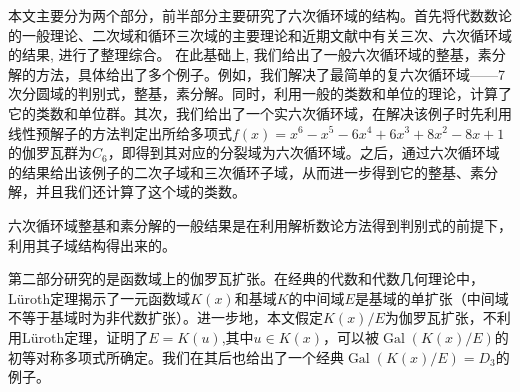 \begin{cnabstract}
本文主要分为两个部分，前半部分主要研究了六次循环域的结构。首先将代数数论的一般理论、二次域和循环三次域的主要理论和近期文献中有关三次、六次循环域的结果, 进行了整理综合。 在此基础上, 我们给出了一般六次循环域的整基，素分解的方法，具体给出了多个例子。例如，我们解决了最简单的复六次循环域——7次分圆域的判别式，整基，素分解。同时，利用一般的类数和单位的理论，计算了它的类数和单位群。其次，我们给出了一个实六次循环域，在解决该例子时先利用线性预解子的方法判定出所给多项式$f(x)=x^6-x^5-6x^4+6x^3+8x^2-8x+1$的伽罗瓦群为$C_6$，即得到其对应的分裂域为六次循环域。之后，通过六次循环域的结果给出该例子的二次子域和三次循环子域，从而进一步得到它的整基、素分解，并且我们还计算了这个域的类数。

六次循环域整基和素分解的一般结果是在利用解析数论方法得到判别式的前提下，利用其子域结构得出来的。

第二部分研究的是函数域上的伽罗瓦扩张。在经典的代数和代数几何理论中，L\"{u}roth定理揭示了一元函数域$K(x)$和基域$K$的中间域$E$是基域的单扩张（中间域不等于基域时为非代数扩张）。进一步地，本文假定$K(x)/E$为伽罗瓦扩张，不利用L\"{u}roth定理，证明了$E=K(u)$,其中$u\in K(x)$，可以被$\operatorname{Gal}(K(x)/E)$的初等对称多项式所确定。我们在其后也给出了一个经典$\operatorname{Gal}(K(x)/E)=D_3$的例子。

\end{cnabstract}

